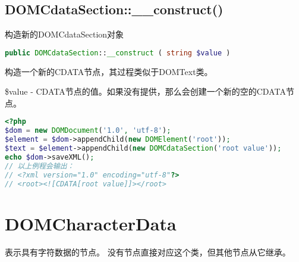 \subsection{DOMCdataSection::\_\_construct()}


构造新的DOMCdataSection对象


\begin{lstlisting}[language=PHP]
public DOMCdataSection::__construct ( string $value )
\end{lstlisting}

构造一个新的CDATA节点，其过程类似于DOMText类。

\begin{compactitem}
\item \$value - CDATA节点的值。如果没有提供，那么会创建一个新的空的CDATA节点。
\end{compactitem}


\begin{lstlisting}[language=PHP]
<?php
$dom = new DOMDocument('1.0', 'utf-8');
$element = $dom->appendChild(new DOMElement('root'));
$text = $element->appendChild(new DOMCdataSection('root value'));
echo $dom->saveXML();
// 以上例程会输出：
// <?xml version="1.0" encoding="utf-8"?>
// <root><![CDATA[root value]]></root>
\end{lstlisting}




\section{DOMCharacterData}

表示具有字符数据的节点。 没有节点直接对应这个类，但其他节点从它继承。



